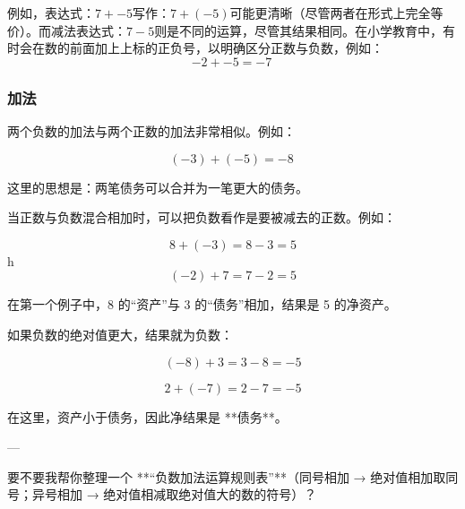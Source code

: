 例如，表达式：$7 + -5$写作：$7 + (-5)$可能更清晰（尽管两者在形式上完全等价）。而减法表达式：$7 - 5$则是不同的运算，尽管其结果相同。在小学教育中，有时会在数的前面加上上标的正负号，以明确区分正数与负数，例如：
$$
-2 + -5 = -7~
$$
\subsubsection{加法}
两个负数的加法与两个正数的加法非常相似。例如：

$$
(-3) + (-5) = -8~
$$

这里的思想是：两笔债务可以合并为一笔更大的债务。

当正数与负数混合相加时，可以把负数看作是要被减去的正数。例如：

$$
8 + (-3) = 8 - 3 = 5
$$
h
$$
(-2) + 7 = 7 - 2 = 5
$$

在第一个例子中，8 的“资产”与 3 的“债务”相加，结果是 5 的净资产。

如果负数的绝对值更大，结果就为负数：

$$
(-8) + 3 = 3 - 8 = -5
$$

$$
2 + (-7) = 2 - 7 = -5
$$

在这里，资产小于债务，因此净结果是 **债务**。

---

要不要我帮你整理一个 **“负数加法运算规则表”**（同号相加 → 绝对值相加取同号；异号相加 → 绝对值相减取绝对值大的数的符号）？

